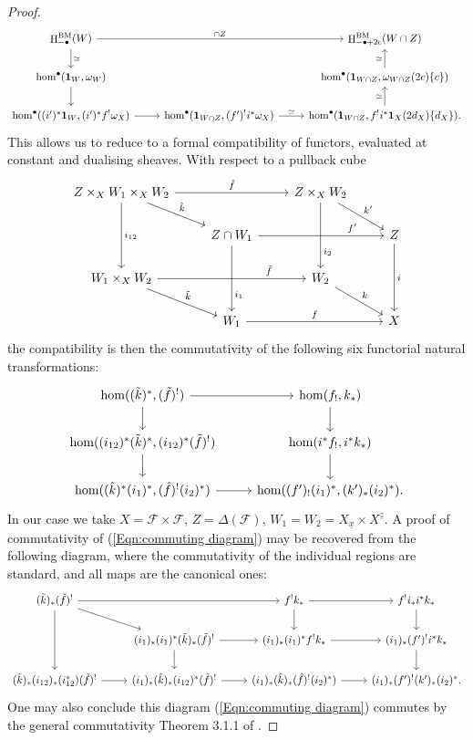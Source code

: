 \documentclass[11pt]{article}
\DeclareMathOperator{\hH}{\mathrm{H}}
\theoremstyle{remark}
\theoremstyle{definition}
\begin{document}
\begin{proof}
\[\begin{tikzcd}
    \hH_{-\bullet}^{\text{BM}}(W)\arrow[rr,"\cap Z"]\arrow[d,"\simeq"]&& \hH_{-\bullet+2c}^{\text{BM}}(W\cap Z)\\
    \hom^{\bullet}(\mathbf{1}_W,\omega_W)\arrow[d]&& \hom^\bullet(\mathbf{1}_{W\cap Z},\omega_{W\cap Z}(2c)\{c\})\arrow[u,"\simeq"]\\
    \hom^{\bullet}((i')^*\mathbf{1}_W,(i')^*f^!\omega_X)\arrow[r]& \hom^\bullet(\mathbf{1}_{W\cap Z},(f')^!i^*\omega_X)\arrow[r,"\simeq"]& \hom^\bullet(\mathbf{1}_{W\cap Z},f^!i^*\mathbf{1}_X(2d_X)\{d_X\})\arrow[u,"\simeq"].
\end{tikzcd}\]
This allows us to reduce to a formal compatibility of functors, evaluated at constant and dualising sheaves. With respect to a pullback cube 
\[\begin{tikzcd}
Z\times_X W_1\times_X W_2 \arrow[rr,"\hat{f}"]\arrow[dr,"\hat{k}"]\arrow[dd,"i_{12}"]&&Z\times_X W_2\arrow[dd,"i_2",near end]\arrow[dr,"k'"]\\
&Z\cap W_1\arrow[rr,"f'",near end]\arrow[dd,"i_1",near end]&&Z\arrow[dd,"i"]\\
W_1\times_X W_2\arrow[rr,"\tilde{f}",near end]\arrow[dr,"\tilde{k}"]&&W_2\arrow[dr,"k"]\\
&W_1\arrow[rr,"f"]&&X
\end{tikzcd}\]
the compatibility is then the commutativity of the following six functorial natural transformations: 
\begin{equation}\label{Eqn:commuting diagram}
\begin{tikzcd}
\hom((\tilde{k})^*,(\tilde{f})^!)\arrow[r]\arrow[d]&\hom(f_!,k_*)\arrow[d]\\
\hom((i_{12})^*(\tilde{k})^*,(i_{12})^*(\tilde{f})^!)\arrow[d]&\hom(i^*f_!,i^*k_*)\arrow[d]\\
\hom((\hat{k})^*(i_1)^*,(\hat{f})^!(i_2)^*)\arrow[r]&\hom((f')_!(i_1)^*,(k')_*(i_2)^*).
\end{tikzcd}
\end{equation}
In our case we take $X=\mathcal{F}\times \mathcal{F}$, $Z=\Delta(\mathcal{F})$, $W_1=W_2=X_{\underline{x}}\times X^{\underline{z}}$. 
A proof of commutativity of (\ref{Eqn:commuting diagram}) may be recovered from the following diagram, where the commutativity of the individual regions are standard, and all maps are the canonical ones:
\[\begin{tikzcd}
(\tilde{k})_*(\tilde{f})^! \arrow[rd] \arrow[dd] \arrow[rr] &                                  & f^!k_* \arrow[d] \arrow[r] & f^!i_*i^*k_* \arrow[d] \\
                                        & (i_1)_*(i_1)^*(\tilde{k})_*(\tilde{f})^! \arrow[r] \arrow[d] & (i_1)_*(i_1)^*f^!k_* \arrow[r]     & (i_1)_*(f')^!i^*k_* \arrow[d] \\
(\tilde{k})_*(i_{12})_*(i_{12}^*)(\tilde{f})^! \arrow[r]                  & (i_1)_*(\hat{k})_*(i_{12})^*(\tilde{f})^! \arrow[r]           & (i_1)_*(\hat{k})_*(\hat{f})^!(i_2)^*) \arrow[r]     & (i_1)_*(f')^!(k')_*(i_2)^*     .     
\end{tikzcd}\]
One may also conclude this diagram (\ref{Eqn:commuting diagram}) commutes by the general commutativity Theorem 3.1.1 of \cite[\S3]{Hon25}.

\end{proof}
\end{document}
